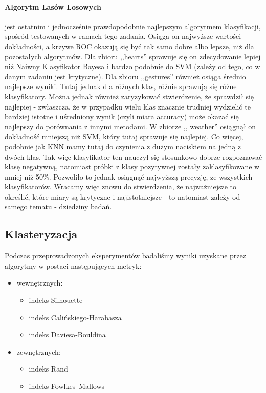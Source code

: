 \documentclass{classrep}
\begin{document}
{{            \paragraph{Algorytm Lasów Losowych} jest ostatnim i jednocześnie
            prawdopodobnie najlepszym algorytmem klasyfikacji, spośród testowanych w
            ramach tego zadania. Osiąga on najwyższe wartości dokładności, a krzywe ROC
            okazują się być tak samo dobre albo lepsze, niż dla pozostałych algorytmów.
            Dla zbioru ,,hearts'' sprawuje się on zdecydowanie lepiej niż Naiwny
            Klasyfikator Bayesa i bardzo podobnie do SVM (zależy od tego, co w danym
            zadaniu jest krytyczne). Dla zbioru ,,gestures'' również osiąga średnio
            najlepsze wyniki. Tutaj jednak dla różnych klas, różnie sprawują się różne
            klasyfikatory. Można jednak również zaryzykować stwierdzenie, że sprawdził
            się najlepiej - zwłaszcza, że w przypadku wielu klas znacznie trudniej
            wydzielić te bardziej istotne i uśredniony wynik (czyli miara accuracy)
            może okazać się najlepszy do porównania z innymi metodami. W zbiorze ,,
            weather'' osiągnął on dokładność mniejszą niż SVM, który tutaj sprawuje się
            najlepiej. Co więcej, podobnie jak KNN mamy tutaj do czynienia z dużym
            naciskiem na jedną z dwóch klas. Tak więc klasyfikator ten nauczył się
            stosunkowo dobrze rozpoznawać klasę negatywną, natomiast próbki z klasy
            pozytywnej zostały zaklasyfikowane w mniej niż 50\%. Pozwoliło to jednak
            osiągnąć najwyższą precyzję, ze wszystkich klasyfikatorów. Wracamy więc
            znowu do stwierdzenia, że najważniejsze to określić, które miary są
            krytyczne i najistotniejsze - to natomiast zależy od samego tematu -
            dziedziny badań.
        }

        \subsection{Klasteryzacja}
        \label{summary:clustering} {
            Podczas przeprowadzonych eksperymentów badaliśmy wyniki uzyskane przez algorytmy w postaci następujących metryk:
            \begin{itemize}
                \item wewnętrznych: \begin{itemize}
                    \item indeks Silhouette
                    \item indeks Calińskiego-Harabasza
                    \item indeks Daviesa-Bouldina
                \end{itemize}
                \item zewnętrznych: \begin{itemize}
                    \item indeks Rand
                    \item indeks Fowlkes–Mallows
                \end{itemize}
            \end{itemize}

}}
\end{document}
